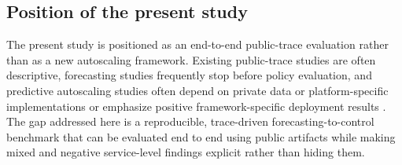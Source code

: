 \subsection{Position of the present study}

The present study is positioned as an end-to-end public-trace evaluation rather than as a new autoscaling framework. Existing public-trace studies are often descriptive, forecasting studies frequently stop before policy evaluation, and predictive autoscaling studies often depend on private data or platform-specific implementations or emphasize positive framework-specific deployment results \citep{Zanussi2026LoadAwareAutoscaling}. The gap addressed here is a reproducible, trace-driven forecasting-to-control benchmark that can be evaluated end to end using public artifacts while making mixed and negative service-level findings explicit rather than hiding them.
